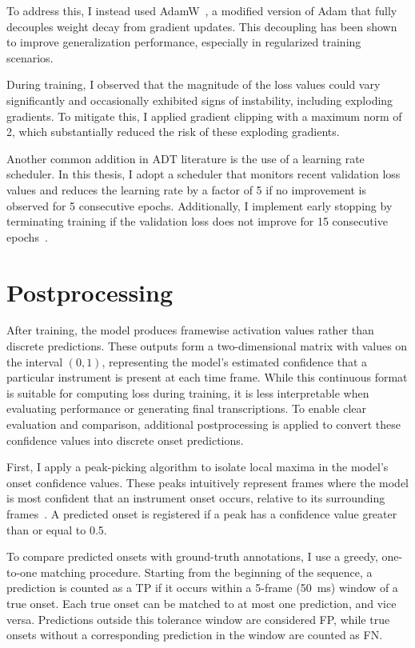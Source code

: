 To address this, I instead used AdamW~\cite{loshchilov2019decoupledweightdecayregularization}, a modified version of Adam that fully decouples weight decay from gradient updates. This decoupling has been shown to improve generalization performance, especially in regularized training scenarios.

During training, I observed that the magnitude of the loss values could vary significantly and occasionally exhibited signs of instability, including exploding gradients. To mitigate this, I applied gradient clipping with a maximum norm of 2, which substantially reduced the risk of these exploding gradients.

Another common addition in \gls{ADT} literature is the use of a learning rate scheduler. In this thesis, I adopt a scheduler that monitors recent validation loss values and reduces the learning rate by a factor of 5 if no improvement is observed for 5 consecutive epochs. Additionally, I implement early stopping by terminating training if the validation loss does not improve for 15 consecutive epochs~\cite{chang2024yourmt3+, signals4040042}.

\section{Postprocessing}

After training, the model produces framewise activation values rather than discrete predictions. These outputs form a two-dimensional matrix with values on the interval $(0, 1)$, representing the model's estimated confidence that a particular instrument is present at each time frame. While this continuous format is suitable for computing loss during training, it is less interpretable when evaluating performance or generating final transcriptions. To enable clear evaluation and comparison, additional postprocessing is applied to convert these confidence values into discrete onset predictions.

First, I apply a peak-picking algorithm to isolate local maxima in the model's onset confidence values. These peaks intuitively represent frames where the model is most confident that an instrument onset occurs, relative to its surrounding frames~\cite{Bck2012EvaluatingTO, vogl2018multiinstrumentdrumtranscription}. A predicted onset is registered if a peak has a confidence value greater than or equal to 0.5.

To compare predicted onsets with ground-truth annotations, I use a greedy, one-to-one matching procedure. Starting from the beginning of the sequence, a prediction is counted as a \acrfull{TP} if it occurs within a 5-frame (50~ms) window of a true onset. Each true onset can be matched to at most one prediction, and vice versa. Predictions outside this tolerance window are considered \acrfull{FP}, while true onsets without a corresponding prediction in the window are counted as \acrfull{FN}.

